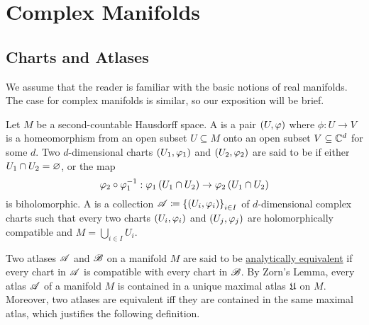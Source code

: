 \chapter{Complex Manifolds}
\section{Charts and Atlases}
We assume that the reader is familiar with the basic notions of real manifolds. The case for complex manifolds is similar, so our exposition will be brief.
\begin{definition}
    Let $M$ be a second-countable Hausdorff space. A   is a pair $\tpl{U,\phi}$ where $\phi:U\to V$ is a homeomorphism from an open subset $U\subseteq M$ onto an open subset $V\subseteq\C^d$ for some $d$. Two $d$-dimensional charts $\l(U_1,\phi_1\r)$ and $\l(U_2,\phi_2\r)$ are said to be  if either $U_1\cap U_2=\em$, or the map
    \begin{equation*}
        \phi_2\circ\phi_1^{-1}:\phi_1\l(U_1\cap U_2\r)\to\phi_2\l(U_1\cap U_2\r)
    \end{equation*}
    is biholomorphic. A  is a collection $\ms{A}\coloneqq\l\{\l(U_i,\phi_i\r)\r\}_{i\in I}$ of $d$-dimensional complex charts such that every two charts $\l(U_i,\phi_i\r)$ and $\l(U_j,\phi_j\r)$ are holomorphically compatible and $M=\bigcup_{i\in I}U_i$.
\end{definition}
\begin{remark}
    Two atlases $\ms{A}$ and $\ms{B}$ on a manifold $M$ are said to be \ul{analytically equivalent} if every chart in $\ms{A}$ is compatible with every chart in $\ms{B}$. By Zorn's Lemma, every atlas $\ms{A}$ of a manifold $M$ is contained in a unique maximal atlas $\mf{U}$ on $M$. Moreover, two atlases are equivalent iff they are contained in the same maximal atlas, which justifies the following definition.\exqed
\end{remark}
